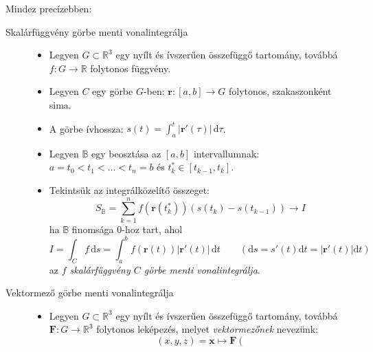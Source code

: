 \documentclass[%
	DIV=15,appendixprefix]{scrreprt}
\theoremstyle{definition}
\theoremstyle{remark}
\begin{document}
Mindez precízebben:
\begin{description}
	\item[Skalárfüggvény görbe menti vonalintegrálja]\leavevmode
		\begin{itemize}
			\item Legyen $ G \subset \mathbb{ R }^{ 3 } $ egy nyílt és ívszerűen összefüggő
			tartomány, továbbá $ f \colon  G \rightarrow \mathbb{R} $ folytonos függvény.
			\item Legyen $ C $ egy görbe $ G $-ben: $ \mathbf{r} \colon \left[ a,{} b \right]
				\rightarrow G $ folytonos, szakaszonként sima.
			\item A görbe ívhossza: $ s \left( t \right) = \int_{ a }^{ t } \left| \mathbf{ r }'
				\left( \tau \right) \right| \, \mathrm{ d } \tau $.
			\item Legyen $ \mathbb{ B } $ egy beosztása az $ \left[ a,{} b \right] $ intervallumnak:
				$ a = t_{ 0 } < t_{ 1 } < \ldots < t_{ n } = b $ és $t_{ k }^{ * } \in \left[
				t_{ k - 1 },{} t_{ k } \right] $.
			\item Tekintsük az integrálközelítő összeget:
				\begin{equation*}
					S_{ \mathbb{ B } } = \sum_{ k = 1 }^{ n } f \left( \mathbf{ r } \left(
					t_{ k }^{ * } \right) \right) \left( s \left( t_{ k } \right) - s \left(
					t_{ k - 1 } \right) \right) \rightarrow I
				\end{equation*}
				ha $ \mathbb{ B } $ finomsága 0-hoz tart, ahol
				\begin{equation*}
					I = \int_{ C } f \, \mathrm{ d } s = \int_{ a }^{ b } f \left( \mathbf{ r }
					\left( t \right) \right) \left| \mathbf{ r }' \left( t \right) \right| \,
					\mathrm{ d } t \qquad \left( \mathrm{ d } s = s' \left( t \right) \mathrm{ d } t
					= \left| \mathbf{ r }' \left( t \right) \right| \mathrm{ d } t \right)
				\end{equation*}
				az \emph{$ f $ skalárfüggvény $ C $ görbe menti vonalintegrálja}.
		\end{itemize}
	\item[Vektormező görbe menti vonalintegrálja]\leavevmode
		\begin{itemize}
			\item Legyen $ G \subset \mathbb{ R }^{ 3 } $ egy nyílt és ívszerűen összefüggő
				tartomány, továbbá $ \mathbf{ F } \colon G \rightarrow \mathbb{ R }^{ 3 } $
				folytonos
				leképezés, melyet \emph{vektormezőnek} nevezünk:
				\begin{equation*}
					\left( x,{} y,{} z \right) = \mathbf{ x } \mapsto \mathbf{ F } \left(

\end{equation*}
\end{itemize}
\end{description}
\end{document}
